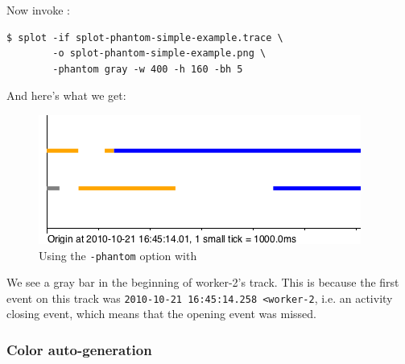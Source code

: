 \documentclass{article}
\begin{document}
Now invoke \splot{}:
\begin{verbatim}
$ splot -if splot-phantom-simple-example.trace \
        -o splot-phantom-simple-example.png \
        -phantom gray -w 400 -h 160 -bh 5 
\end{verbatim}

And here's what we get:

\begin{figure}[h!]
\center
\includegraphics[scale=0.5]{pics/splot/splot-phantom-simple-example.png}
\caption{Using the \texttt{-phantom} option with \splot{}}
\end{figure}

We see a gray bar in the beginning of worker-2's track. This is because the first event on this track was \verb|2010-10-21 16:45:14.258 <worker-2|, i.e. an activity closing event, which means that the opening event was missed.

\subsubsection{Color auto-generation}
\end{document}
